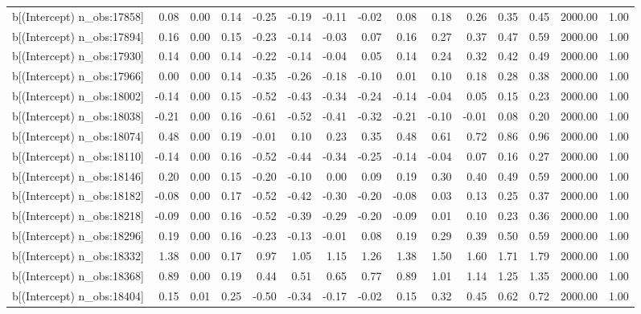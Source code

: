 \begin{table}[ht]
\begin{tabular}{rrrrrrrrrrrrrrr}
  b[(Intercept) n\_obs:17858] & 0.08 & 0.00 & 0.14 & -0.25 & -0.19 & -0.11 & -0.02 & 0.08 & 0.18 & 0.26 & 0.35 & 0.45 & 2000.00 & 1.00 \\ 
  b[(Intercept) n\_obs:17894] & 0.16 & 0.00 & 0.15 & -0.23 & -0.14 & -0.03 & 0.07 & 0.16 & 0.27 & 0.37 & 0.47 & 0.59 & 2000.00 & 1.00 \\ 
  b[(Intercept) n\_obs:17930] & 0.14 & 0.00 & 0.14 & -0.22 & -0.14 & -0.04 & 0.05 & 0.14 & 0.24 & 0.32 & 0.42 & 0.49 & 2000.00 & 1.00 \\ 
  b[(Intercept) n\_obs:17966] & 0.00 & 0.00 & 0.14 & -0.35 & -0.26 & -0.18 & -0.10 & 0.01 & 0.10 & 0.18 & 0.28 & 0.38 & 2000.00 & 1.00 \\ 
  b[(Intercept) n\_obs:18002] & -0.14 & 0.00 & 0.15 & -0.52 & -0.43 & -0.34 & -0.24 & -0.14 & -0.04 & 0.05 & 0.15 & 0.23 & 2000.00 & 1.00 \\ 
  b[(Intercept) n\_obs:18038] & -0.21 & 0.00 & 0.16 & -0.61 & -0.52 & -0.41 & -0.32 & -0.21 & -0.10 & -0.01 & 0.08 & 0.20 & 2000.00 & 1.00 \\ 
  b[(Intercept) n\_obs:18074] & 0.48 & 0.00 & 0.19 & -0.01 & 0.10 & 0.23 & 0.35 & 0.48 & 0.61 & 0.72 & 0.86 & 0.96 & 2000.00 & 1.00 \\ 
  b[(Intercept) n\_obs:18110] & -0.14 & 0.00 & 0.16 & -0.52 & -0.44 & -0.34 & -0.25 & -0.14 & -0.04 & 0.07 & 0.16 & 0.27 & 2000.00 & 1.00 \\ 
  b[(Intercept) n\_obs:18146] & 0.20 & 0.00 & 0.15 & -0.20 & -0.10 & 0.00 & 0.09 & 0.19 & 0.30 & 0.40 & 0.49 & 0.59 & 2000.00 & 1.00 \\ 
  b[(Intercept) n\_obs:18182] & -0.08 & 0.00 & 0.17 & -0.52 & -0.42 & -0.30 & -0.20 & -0.08 & 0.03 & 0.13 & 0.25 & 0.37 & 2000.00 & 1.00 \\ 
  b[(Intercept) n\_obs:18218] & -0.09 & 0.00 & 0.16 & -0.52 & -0.39 & -0.29 & -0.20 & -0.09 & 0.01 & 0.10 & 0.23 & 0.36 & 2000.00 & 1.00 \\ 
  b[(Intercept) n\_obs:18296] & 0.19 & 0.00 & 0.16 & -0.23 & -0.13 & -0.01 & 0.08 & 0.19 & 0.29 & 0.39 & 0.50 & 0.59 & 2000.00 & 1.00 \\ 
  b[(Intercept) n\_obs:18332] & 1.38 & 0.00 & 0.17 & 0.97 & 1.05 & 1.15 & 1.26 & 1.38 & 1.50 & 1.60 & 1.71 & 1.79 & 2000.00 & 1.00 \\ 
  b[(Intercept) n\_obs:18368] & 0.89 & 0.00 & 0.19 & 0.44 & 0.51 & 0.65 & 0.77 & 0.89 & 1.01 & 1.14 & 1.25 & 1.35 & 2000.00 & 1.00 \\ 
  b[(Intercept) n\_obs:18404] & 0.15 & 0.01 & 0.25 & -0.50 & -0.34 & -0.17 & -0.02 & 0.15 & 0.32 & 0.45 & 0.62 & 0.72 & 2000.00 & 1.00 \\ 

\end{tabular}
\end{table}
